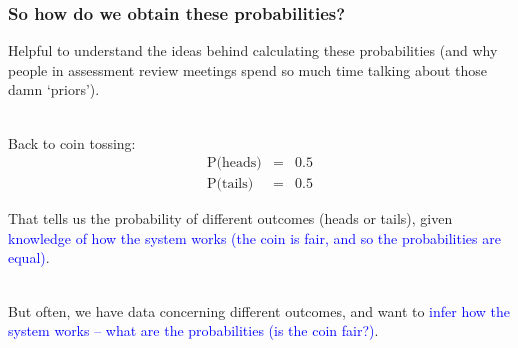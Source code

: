 
\begin{frame}
\frametitle{So how do we obtain these probabilities?}

Helpful to understand the ideas behind calculating these
probabilities
(and why people in assessment review meetings spend so much time
talking about those damn `priors').

~\\

Back to coin tossing:
\begin{eqnarray}
\nonumber \mbox{P(heads)} & = & 0.5\\
\nonumber \mbox{P(tails)} & = & 0.5
\end{eqnarray}

That tells us the \alert{probability of different outcomes} (heads or tails), given
\textcolor{blue}{knowledge of how the system works (the coin is fair, and so the probabilities are equal)}.

~\\

But often, we have \alert{data concerning different outcomes}, and want to
\textcolor{blue}{infer how the system works -- what are the probabilities (is
  the coin fair?)}.

\end{frame}



